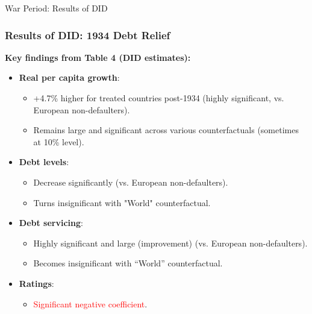 \documentclass{beamer}
\begin{document}
\begin{frame}{War Period: Results of DID}
  \frametitle{Results of DID: 1934 Debt Relief}
  \textbf{Key findings from Table 4 (DID estimates):}
  \begin{itemize}
    \item \textbf{Real per capita growth}:
    \begin{itemize}
        \item \textcolor{green!70!black}{+4.7\% higher} for treated countries post-1934 (highly significant, vs. European non-defaulters).
        \item Remains large and significant across various counterfactuals (sometimes at 10\% level).
    \end{itemize}
    \item \textbf{Debt levels}:
    \begin{itemize}
        \item \textcolor{green!70!black}{Decrease significantly} (vs. European non-defaulters).
        \item Turns insignificant with "World" counterfactual.
    \end{itemize}
    \item \textbf{Debt servicing}:
    \begin{itemize}
        \item \textcolor{green!70!black}{Highly significant and large} (improvement) (vs. European non-defaulters).
        \item Becomes insignificant with ``World'' counterfactual.
    \end{itemize}
    \item \textbf{Ratings}:
    \begin{itemize}
        \item \textcolor{red}{Significant negative coefficient}.
    \end{itemize}
  \end{itemize}
\end{frame}
\end{document}
